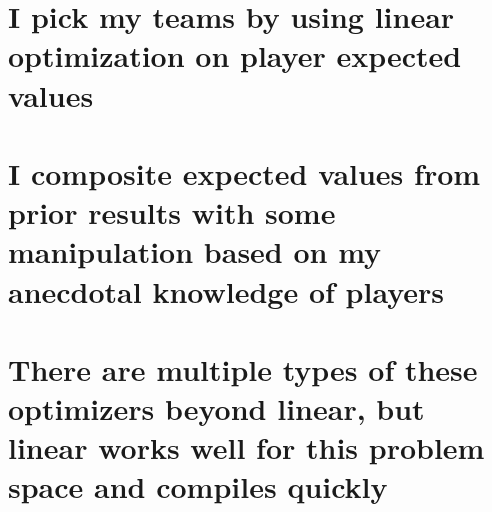 \documentclass[11pt]{article}
\begin{document}
    \section{I pick my teams by using linear optimization on player expected
values}\label{i-pick-my-teams-by-using-linear-optimization-on-player-expected-values}

\section{I composite expected values from prior results with some
manipulation based on my anecdotal knowledge of
players}\label{i-composite-expected-values-from-prior-results-with-some-manipulation-based-on-my-anecdotal-knowledge-of-players}

\section{There are multiple types of these optimizers beyond linear, but
linear works well for this problem space and compiles
quickly}\label{there-are-multiple-types-of-these-optimizers-beyond-linear-but-linear-works-well-for-this-problem-space-and-compiles-quickly}
\end{document}
